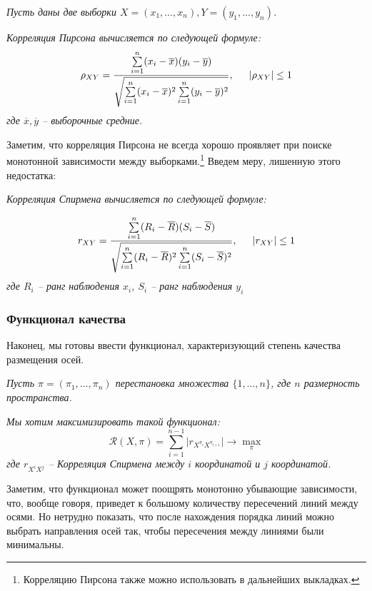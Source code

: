 \documentclass[12pt,fleqn]{article}
\begin{document}
\newpage

\noindent \textit{Пусть даны две выборки $X=(x_1, \ldots ,x_n), Y=(y_1,\ldots ,y_n)$.}

\noindent \textit{Корреляция Пирсона вычисляется по следующей формуле:}
$$
    \rho_{XY} = 
    \frac{\sum\limits_{i=1}^{n}(x_i-\overline x)(y_i-\overline y)}
    {\sqrt{\sum\limits_{i=1}^{n}(x_i-\overline x)^2\sum\limits_{i=1}^{n}(y_i-\overline y)^2}}, 
    \hspace{15px} \left\lvert \rho_{XY} \right\rvert \leq 1
$$   
\textit{где $\overline x, \overline y$ -- выборочные средние.}

\vspace{10pt}

\noindent Заметим, что корреляция Пирсона не всегда хорошо проявляет при поиске монотонной зависимости между
выборками.\footnote{Корреляцию Пирсона также можно использовать в дальнейших выкладках.}
Введем меру, лишенную этого недостатка:

\vspace{10pt}

\noindent \textit{Корреляция Спирмена вычисляется по следующей формуле:}

$$
    r_{XY} = 
    \frac{\sum\limits_{i=1}^{n}(R_i-\overline R)(S_i-\overline S)}
    {\sqrt{\sum\limits_{i=1}^{n}(R_i-\overline R)^2\sum\limits_{i=1}^{n}(S_i-\overline S)^2}},
    \hspace{15px} \left\lvert r_{XY} \right\rvert \leq 1
$$
\noindent \textit{где $R_i$ -- ранг наблюдения $x_i$, $S_i$ -- ранг наблюдения $y_i$}

\subsubsection*{Функционал качества}
Наконец, мы готовы ввести функционал, характеризующий степень качества размещения осей.

\vspace{10pt}

\noindent \textit{Пусть $\pi = (\pi_1, \ldots , \pi_n)$ перестановка множества $\{1,\ldots, n\}$, где $n$ размерность пространства.}

\noindent \textit{Мы хотим максимизировать такой функционал:}
$$\mathcal{R} (X,\pi)=\sum\limits_{i=1}^{n-1}|r_{X^{\pi_i}X^{\pi_{i+1}}}| \rightarrow \max\limits_\pi$$
\textit{где $r_{X^iX^j}$ -- Корреляция Спирмена между  $i$ координатой и $j$ координатой.}

\vspace{10pt}
Заметим, что функционал может поощрять монотонно убывающие зависимости, что, вообще говоря, приведет к
большому количеству пересечений линий между осями. Но нетрудно показать, что после нахождения порядка линий можно выбрать направления осей так, 
чтобы пересечения между линиями были минимальны.
\end{document}
